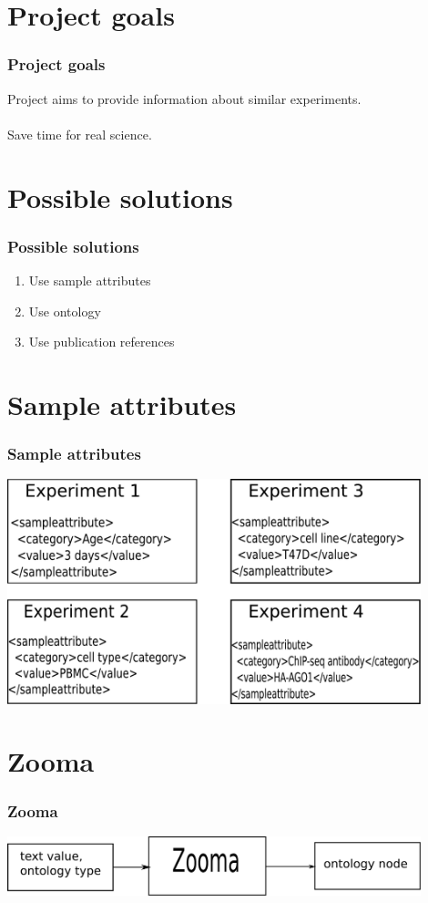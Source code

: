 \documentclass[utf8,handout]{beamer}
\begin{document}
\section{Project goals}
  \begin{frame}
    \frametitle{Project goals}
    \begin{block}{}
    	{
    	\Large
    	Project aims to provide information about similar experiments.\\
    	\ \\
    	Save time for real science.}
	\end{block}

  \end{frame}

\section{Possible solutions}
  \begin{frame}

    \frametitle{Possible solutions}
    \begin{enumerate}
      \item Use sample attributes
      \item Use ontology
      \item Use publication references
    \end{enumerate}
  \end{frame}

\section{Sample attributes}
  \begin{frame}
    \frametitle{Sample attributes}  
	\includegraphics[width=0.9\textwidth]{./sampleAttribute}       
  \end{frame}


\section{Zooma}
  \begin{frame}
    \frametitle{Zooma}  
	\includegraphics[width=0.9\textwidth]{./zooma}       
  \end{frame}
\end{document}
